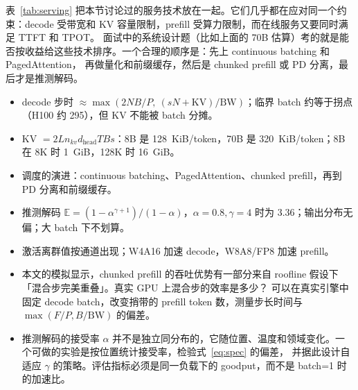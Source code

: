 表~\ref{tab:serving} 把本节讨论过的服务技术放在一起。它们几乎都在应对同一个约束：decode 受带宽和 KV 容量限制，prefill 受算力限制，而在线服务又要同时满足 TTFT 和 TPOT。
面试中的系统设计题（比如上面的 70B 估算）考的就是能否按收益给这些技术排序。一个合理的顺序是：先上 continuous batching 和 PagedAttention，
再做量化和前缀缓存，然后是 chunked prefill 或 PD 分离，最后才是推测解码。

\begin{keypts}
\begin{itemize}
\item decode 步时 $\approx\max(2NB/P,\ (sN+\mathrm{KV})/\mathrm{BW})$；临界 batch 约等于拐点（H100 约 295），但 KV 不能被 batch 分摊。
\item KV $=2Ln_{kv}d_{\text{head}}TBs$：8B 是 128~KiB/token，70B 是 320~KiB/token；8B 在 8K 时 1~GiB，128K 时 16~GiB。
\item 调度的演进：continuous batching、PagedAttention、chunked prefill，再到 PD 分离和前缀缓存。
\item 推测解码 $\mathbb{E}=(1-\alpha^{\gamma+1})/(1-\alpha)$，$\alpha=0.8,\gamma=4$ 时为 3.36；输出分布无偏；大 batch 下不划算。
\item 激活离群值按通道出现；W4A16 加速 decode，W8A8/FP8 加速 prefill。
\end{itemize}
\end{keypts}

\begin{research}
\begin{itemize}
\item 本文的模拟显示，chunked prefill 的吞吐优势有一部分来自 roofline 假设下「混合步完美重叠」。真实 GPU 上混合步的效率是多少？
可以在真实引擎中固定 decode batch，改变捎带的 prefill token 数，测量步长时间与 $\max(F/P,B/\mathrm{BW})$ 的偏差。
\item 推测解码的接受率 $\alpha$ 并不是独立同分布的，它随位置、温度和领域变化。一个可做的实验是按位置统计接受率，检验式~\eqref{eq:spec} 的偏差，
并据此设计自适应 $\gamma$ 的策略。评估指标必须是同一负载下的 goodput，而不是 batch=1 时的加速比。
\end{itemize}
\end{research}
